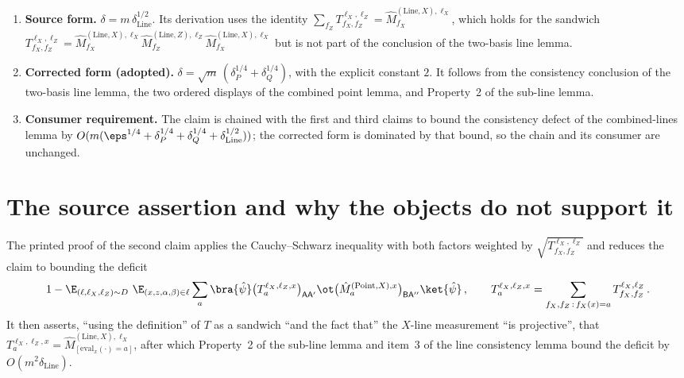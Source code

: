 \documentclass[11pt]{article}
\begin{document}
\begin{enumerate}
  \item \textbf{Source form.}  $\delta = m\,\delta_{\mathrm{Line}}^{1/2}$.
  Its derivation uses the identity
  $\sum_{f_Z} T^{\ell_X,\ell_Z}_{f_X,f_Z} =
  \hat{M}^{(\mathrm{Line},X),\ell_X}_{f_X}$, which holds for the sandwich
  $T^{\ell_X,\ell_Z}_{f_X,f_Z} = \hat{M}^{(\mathrm{Line},X),\ell_X}_{f_X}
  \hat{M}^{(\mathrm{Line},Z),\ell_Z}_{f_Z}
  \hat{M}^{(\mathrm{Line},X),\ell_X}_{f_X}$ but is not part of the
  conclusion of the two-basis line lemma.
  \item \textbf{Corrected form (adopted).}
  $\delta = \sqrt{m}\,(\delta_P^{1/4} + \delta_Q^{1/4})$, with the explicit
  constant $2$.  It follows from the consistency conclusion of the
  two-basis line lemma, the two ordered displays of the combined point
  lemma, and Property~2 of the sub-line lemma.
  \item \textbf{Consumer requirement.}  The claim is chained with the
  first and third claims to bound the consistency defect of the
  combined-lines lemma by
  $O(m(\eps^{1/4} + \delta_P^{1/4} + \delta_Q^{1/4} +
  \delta_{\mathrm{Line}}^{1/2}))$; the corrected form is dominated by that
  bound, so the chain and its consumer are unchanged.
\end{enumerate}

\section{The source assertion and why the objects do not support it}

The printed proof of the second claim applies the Cauchy--Schwarz
inequality with both factors weighted by
$\sqrt{T^{\ell_X,\ell_Z}_{f_X,f_Z}}$ and reduces the claim to bounding the
deficit
\begin{equation*}
  1 - \E_{(\ell,\ell_X,\ell_Z) \sim D}\ \E_{(x,z,\alpha,\beta) \in \ell}
  \sum_a \bra{\hat\psi}
  \big(T^{\ell_X,\ell_Z,x}_{a}\big)_{\mathsf{A}\mathsf{A}'} \ot
  \big(\hat{M}^{(\mathrm{Point},X),x}_{a}\big)_{\mathsf{B}\mathsf{A}''}
  \ket{\hat\psi}\,,
  \qquad
  T^{\ell_X,\ell_Z,x}_{a} = \sum_{f_X,f_Z \,:\, f_X(x)=a}
  T^{\ell_X,\ell_Z}_{f_X,f_Z}\,.
\end{equation*}
It then asserts, ``using the definition'' of $T$ as a sandwich ``and the
fact that'' the $X$-line measurement ``is projective'', that
$T^{\ell_X,\ell_Z,x}_{a} =
\hat{M}^{(\mathrm{Line},X),\ell_X}_{[\mathrm{eval}_x(\cdot)=a]}$, after
which Property~2 of the sub-line lemma and item~3 of the line consistency
lemma bound the deficit by $O(m^2\delta_{\mathrm{Line}})$.
\end{document}
